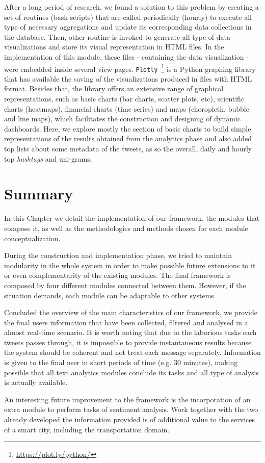 After a long period of research, we found a solution to this problem by creating a set of routines (bash scripts) that are called periodically (hourly) to execute all type of necessary aggregations and update its corresponding data collections in the database. Then, other routine is invoked to generate all type of data visualizations and store its visual representation in \gls{HTML} files. In the implementation of this module, these files - containing the data visualization - were embedded inside several view pages. \texttt{Plotly}~\footnote{\url{https://plot.ly/python/}} is a Python graphing library that has available the saving of the visualizations produced in files with \gls{HTML} format. Besides that, the library offers an extensive range of graphical representations, such as basic charts (bar charts, scatter plots, etc), scientific charts (heatmaps), financial charts (time series) and maps (choropleth, bubble and line maps), which facilitates the construction and designing of dynamic dashboards. Here, we explore mostly the section of basic charts to build simple representations of the results obtained from the analytics phase and also added top lists about some metadata of the tweets, as so the overall, daily and hourly top \textit{hashtags} and uni-grams.

\section{Summary}
In this Chapter we detail the implementation of our framework, the modules that compose it, as well as the methodologies and methods chosen for each module conceptualization. 

During the construction and implementation phase, we tried to maintain modularity in the whole system in order to make possible future extensions to it or even complementarity of the existing modules. The final framework is composed by four different modules connected between them. However, if the situation demands, each module can be adaptable to other systems.

Concluded the overview of the main characteristics of our framework, we provide the final users information that have been collected, filtered and analysed in a almost real-time scenario. It is worth noting that due to the laborious tasks each tweets passes through, it is impossible to provide instantaneous results because the system should be coherent and not treat each message separately. Information is given to the final user in short periods of time (e.g. 30 minutes), making possible that all text analytics modules conclude its tasks and all type of analysis is actually available.

An interesting future improvement to the framework is the incorporation of an extra module to perform tasks of sentiment analysis. Work together with the two already developed the information provided is of additional value to the services of a smart city, including the transportation domain.